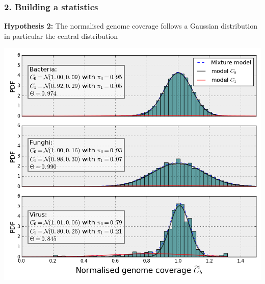 \documentclass{beamer}
\begin{document}
\begin{frame}
 \frametitle{2. Building a statistics}
 
\textbf{Hypothesis 2:} The normalised genome coverage follows a 
Gaussian distribution in particular the central distribution

\begin{center}
\includegraphics[height=0.7\textheight, 
    width=1\textwidth]{images/figure_em.png}
\end{center} 
\end{frame}
\end{document}
